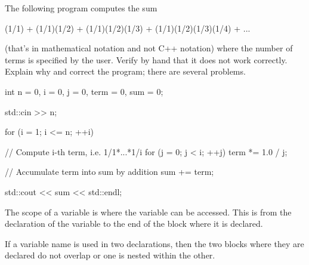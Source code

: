 \begin{ex} The following program computes the sum
\begin{center}
(1/1) + (1/1)(1/2) + (1/1)(1/2)(1/3) + (1/1)(1/2)(1/3)(1/4) + ...
\end{center}
(that's in mathematical notation and not C++ notation)
where the number of terms is specified by the user. Verify by hand that it does not work correctly. Explain why and correct the program; there are several problems.


\begin{console}
int n = 0, i = 0, j = 0, term = 0, sum = 0;

std::cin >> n;

for (i = 1; i <= n; ++i)
{    
     // Compute i-th term, i.e. 1/1*...*1/i
     for (j = 0; j < i; ++j)
     {    
          term *= 1.0 / j;
     }

     // Accumulate term into sum by addition
     sum += term;
}

std::cout << sum << std::endl;
\end{console}
\end{ex}
\newpage{}
The scope of a variable is where the variable can be accessed. This is
from the declaration of the variable to the end of the block where it is
declared.


If a variable name is used in two declarations, then the two blocks
where they are declared do not overlap or one is nested within the
other.

